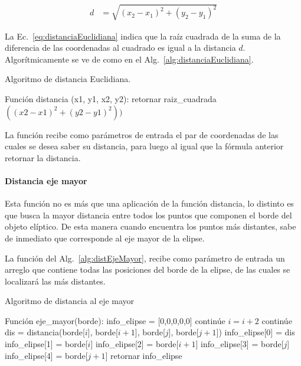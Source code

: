\begin{align}
  d & = \sqrt{\left(x_2 - x_1\right)^2 + \left(y_2 - y_1\right)^2}
  \label{eq:distanciaEuclidiana}
\end{align}

La Ec.~\ref{eq:distanciaEuclidiana} indica que la raíz cuadrada de la
suma de la diferencia de las coordenadas al cuadrado es igual a la
distancia $d$. Algorítmicamente se ve de como en el
Alg.~\ref{alg:distanciaEuclidiana}.

\begin{algorithm}
\caption{Algoritmo de distancia Euclidiana.}
\label{alg:distanciaEuclidiana}
\begin{algorithmic}[1]
\STATE Función distancia (x1, y1, x2, y2):
\STATE retornar raiz\_cuadrada$((x2 - x1)^2 + (y2 - y1)^2))$
\end{algorithmic}
\end{algorithm}

La función recibe como parámetros de entrada el par de coordenadas de
las cuales se desea saber su distancia, para luego al igual que la
fórmula anterior retornar la distancia.

\paragraph{Distancia eje mayor}

Esta función no es más que una aplicación de la función distancia, lo
distinto es que busca la mayor distancia entre todos los puntos que
componen el borde del objeto elíptico. De esta manera cuando encuentra
los puntos más distantes, sabe de inmediato que corresponde al eje
mayor de la elipse. 

La función del Alg.~\ref{alg:distEjeMayor}, recibe como parámetro de
entrada un arreglo que contiene todas las posiciones del borde de la
elipse, de las cuales se localizará las más distantes.

\begin{algorithm}
\caption{Algoritmo de distancia al eje mayor}
\label{alg:distEjeMayor}
\begin{algorithmic}[1]
\STATE Función eje\_mayor(borde):
\STATE info\_elipse = [0,0,0,0,0]
\STATE continúe
\ENDIF
\STATE $i = i + 2$
\STATE continúe
\ENDIF
\STATE dis = distancia(borde[$i$], borde[$i + 1$], borde[$j$], borde[$j + 1$])
\STATE info\_elipse[0] = dis          
\STATE info\_elipse[1] = borde[$i$]     
\STATE info\_elipse[2] = borde[$i+1$]   
\STATE info\_elipse[3] = borde[$j$]
\STATE info\_elipse[4] = borde[$j+1$]
\ENDIF
\ENDWHILE
\ENDWHILE
\STATE retornar info\_elipse
\end{algorithmic}
\end{algorithm}

